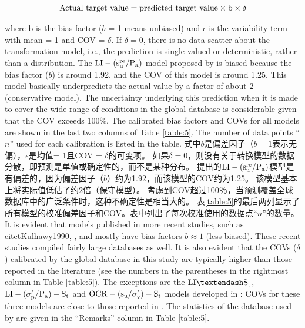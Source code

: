 \begin{paracol}{2}
\begin{Parallel}{0.60\textwidth}{}
{    }
    \ParallelPar
    \begin{align}
        \rm{Actual~ target~value = predicted~target~value\times{}b\times{}\delta}
        \label{equation:1}
    \end{align}
    
    \ParallelLText
    {
        where b is the bias factor ($b$ = 1 means unbiased) and $\epsilon$ is the variability term with mean = 1 and COV = $\delta$. If $\delta = 0$, there is no data scatter about the transformation model, i.e., the prediction is single-valued or deterministic, rather than a distribution. The $\rm{LI}-(s_u^{re}/P_a)$ model proposed by \citet{Locat1988799} is biased because the bias factor ($b$) is around 1.92, and the COV of this model is around 1.25. This model basically underpredicts the actual value by a factor of about 2 (conservative model). The uncertainty underlying this prediction when it is made to cover the wide range of conditions in the global database is considerable given that the COV exceeds 100$\%$. The calibrated bias factors and COVs for all models are shown in the last two columns of Table \ref{table:5}. The number of data points “$n$” used for each calibration is listed in the table.
    }
    \ParallelRText
    {
        式中$b$是偏差因子（$b = 1$表示无偏），$\epsilon$是均值= 1且COV = $ \delta $的可变项。 如果$ \delta = 0 $，则没有关于转换模型的数据分散，即预测是单值或确定性的，而不是某种分布。 \citet{Locat1988799}提出的$\rm{LI}-(s_u^{re}/P_a)$模型是有偏差的，因为偏差因子（$b$）约为1.92，而该模型的COV约为1.25。 该模型基本上将实际值低估了约2倍（保守模型）。 考虑到COV超过100％，当预测覆盖全球数据库中的广泛条件时，这种不确定性是相当大的。 表\ref{table:5}的最后两列显示了所有模型的校准偏差因子和COV。表中列出了每次校准使用的数据点“$n$”的数量。
    }
    \ParallelPar
    \ParallelLText
    {
        It is evident that models published in more recent studies, such as citet{Kulhawy1990}, \citet{Chen1996488}, and \citet{Ching201252, Ching2012522} mostly have bias factors $b\approx{}1$ (less biased). These recent studies compiled fairly large databases as well. It is also evident that the COVs ($\delta$) calibrated by the global database in this study are typically higher than those reported in the literature (see the numbers in the parentheses in the rightmost column in Table \ref{table:5}). The exceptions are the $\rm{LI}–S_t$, $\rm{LI}-(\sigma_p'/P_a)-S_t$ and $\rm{OCR}-(s_u/\sigma_v')-S_t$ models developed in \citet{Ching2012522}: COVs for these three models are close to those reported in \citet{Ching2012522}. The statistics of the database used by \citet{Ching2012522} are given in the “Remarks” column in Table \ref{table:5}. 
}
\end{Parallel}
\end{paracol}
